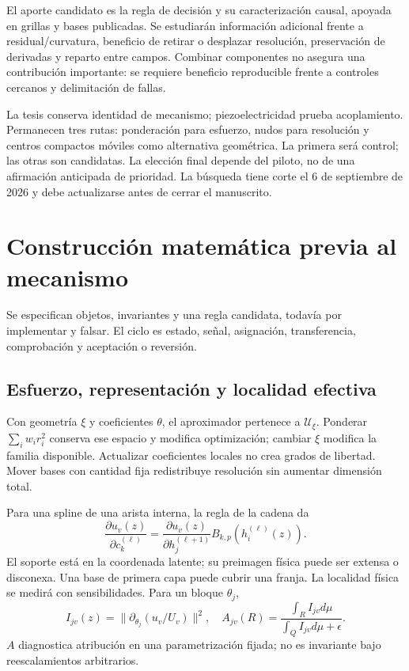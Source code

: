 El aporte candidato es la regla de decisión y su caracterización causal, apoyada en grillas y bases publicadas. Se estudiarán información adicional frente a residual/curvatura, beneficio de retirar o desplazar resolución, preservación de derivadas y reparto entre campos. Combinar componentes no asegura una contribución importante: se requiere beneficio reproducible frente a controles cercanos y delimitación de fallas.

La tesis conserva identidad de mecanismo; piezoelectricidad prueba acoplamiento. Permanecen tres rutas: ponderación para esfuerzo, nudos para resolución y centros compactos móviles como alternativa geométrica. La primera será control; las otras son candidatas. La elección final depende del piloto, no de una afirmación anticipada de prioridad. La búsqueda tiene corte el 6 de septiembre de 2026 y debe actualizarse antes de cerrar el manuscrito.

\section{Construcción matemática previa al mecanismo}
Se especifican objetos, invariantes y una regla candidata, todavía por implementar y falsar. El ciclo es estado, señal, asignación, transferencia, comprobación y aceptación o reversión.
\subsection{Esfuerzo, representación y localidad efectiva}
Con geometría $\xi$ y coeficientes $\theta$, el aproximador pertenece a $\mathcal U_\xi$. Ponderar $\sum_iw_ir_i^2$ conserva ese espacio y modifica optimización; cambiar $\xi$ modifica la familia disponible. Actualizar coeficientes locales no crea grados de libertad. Mover bases con cantidad fija redistribuye resolución sin aumentar dimensión total.

Para una spline de una arista interna, la regla de la cadena da
\begin{equation}\frac{\partial u_v(z)}{\partial c_k^{(\ell)}}=\frac{\partial u_v(z)}{\partial h_j^{(\ell+1)}}B_{k,p}(h_i^{(\ell)}(z)).\label{eq:localidad}\end{equation}
El soporte está en la coordenada latente; su preimagen física puede ser extensa o disconexa. Una base de primera capa puede cubrir una franja. La localidad física se medirá con sensibilidades. Para un bloque $\theta_j$,
\begin{equation}I_{jv}(z)=\|\partial_{\theta_j}(u_v/U_v)\|^2,\quad A_{jv}(R)=\frac{\int_R I_{jv}d\mu}{\int_QI_{jv}d\mu+\epsilon}.\end{equation}
$A$ diagnostica atribución en una parametrización fijada; no es invariante bajo reescalamientos arbitrarios.

